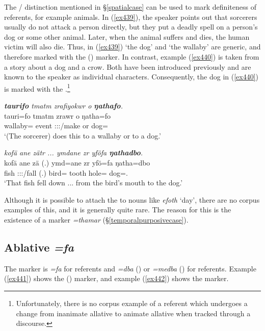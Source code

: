 The / distinction mentioned in {\S}\ref{spatialcase} can be used to mark definiteness of  referents, for example animals. In (\ref{ex439}), the speaker points out that sorcerers usually do not attack a person directly, but they put a deadly spell on a person's dog or some other animal. Later, when the animal suffers and dies, the human victim will also die. Thus, in (\ref{ex439}) `the dog' and `the wallaby' are generic, and therefore marked with the ()   marker. In contrast, example (\ref{ex440}) is taken from a story about a dog and a crow. Both have been introduced previously and are known to the speaker as individual characters. Consequently, the dog in (\ref{ex440}) is marked with the  .\footnote{Unfortunately, there is no corpus example of a referent which undergoes a change from inanimate allative to animate allative when tracked through a discourse.}

\begin{exe}
	\ex \emph{\textbf{taurifo} tmatm zrafiyokwr o \textbf{ŋathafo}.}\\
	\gll tauri=fo tmatm zrawr o ŋatha=fo\\
	wallaby={\All} event \Stsg:\Sbj:\Irr:\Ipfv/make or dog=\All\\
	\trans `(The sorcerer) does this to a wallaby or to a dog.'
	\label{ex439}
\end{exe}
\begin{exe}
	\ex \emph{kofä ane zätr ... ymdane zr yföfa \textbf{ŋathadbo}.}\\
	\gll kofä ane zä (.) ymd=ane zr yfö=fa ŋatha=dbo\\
	fish {\Dem} \Stsg:\Sbj:\Rpst:\Pfv/fall (.) bird={\Poss} tooth hole={\Abl} dog=\All.\Anim\\
	\trans `That fish fell down ... from the bird's mouth to the dog.'
	\label{ex440}
\end{exe}
	
Although it is possible to attach the  to  nouns like \emph{efoth} `day', there are no corpus examples of this, and it is generally quite rare. The reason for this is the existence of a    marker \emph{=thamar} ({\S}\ref{temporalpurposivecase}).

\subsection{Ablative \emph{=fa}} \label{ablativecase}
\largerpage[2]
The   marker is \emph{=fa} for  referents and \emph{=dba} (\Sg) or \emph{=medba} (\Nsg) for  referents. Example (\ref{ex441}) shows the ()   marker, and example (\ref{ex442}) shows the    marker.

